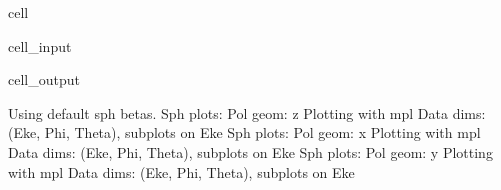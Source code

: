 \documentclass[letterpaper,10pt,english]{jupyterBook}
\begin{document}
\begin{sphinxuseclass}{cell}\begin{sphinxVerbatimInput}

\begin{sphinxuseclass}{cell_input}
\begin{sphinxVerbatim}[commandchars=\\\{\}]
     \PYG{p}{[}  \PYG{p}{]} 
\end{sphinxVerbatim}

\end{sphinxuseclass}\end{sphinxVerbatimInput}
\begin{sphinxVerbatimOutput}

\begin{sphinxuseclass}{cell_output}
\begin{sphinxVerbatim}[commandchars=\\\{\}]
Using default sph betas.
Sph plots: Pol geom: z
Plotting with mpl
Data dims: (\PYGZsq{}Eke\PYGZsq{}, \PYGZsq{}Phi\PYGZsq{}, \PYGZsq{}Theta\PYGZsq{}), subplots on Eke
Sph plots: Pol geom: x
Plotting with mpl
Data dims: (\PYGZsq{}Eke\PYGZsq{}, \PYGZsq{}Phi\PYGZsq{}, \PYGZsq{}Theta\PYGZsq{}), subplots on Eke
Sph plots: Pol geom: y
Plotting with mpl
Data dims: (\PYGZsq{}Eke\PYGZsq{}, \PYGZsq{}Phi\PYGZsq{}, \PYGZsq{}Theta\PYGZsq{}), subplots on Eke
\end{sphinxVerbatim}

\noindent{}

\noindent{}

\noindent{}

\noindent{}

\noindent{}

\noindent{}

\end{sphinxuseclass}\end{sphinxVerbatimOutput}

\end{sphinxuseclass}
\end{document}
